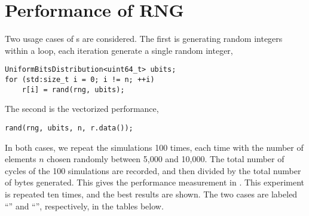 %
%
%
%

\chapter{Performance of RNG}
\label{chap:Performance of RNG}

\system

\compilerthree

Two usage cases of \rng{}s are considered. The first is generating random
integers within a loop, each iteration generate a single random integer,
\begin{verbatim}
UniformBitsDistribution<uint64_t> ubits;
for (std:size_t i = 0; i != n; ++i)
    r[i] = rand(rng, ubits);
\end{verbatim}
The second is the vectorized performance,
\begin{verbatim}
rand(rng, ubits, n, r.data());
\end{verbatim}
In both cases, we repeat the simulations 100 times, each time with the number
of elements $n$ chosen randomly between 5,000 and 10,000. The total number of
cycles of the 100 simulations are recorded, and then divided by the total
number of bytes generated. This gives the performance measurement in \cpb. This
experiment is repeated ten times, and the best results are shown. The two cases
are labeled ``\single'' and ``\batch'', respectively, in the tables below.

